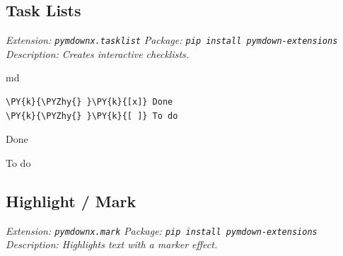 \documentclass[a4paper,twoside]{article}
\begin{document}
\subsection{Task Lists}\label{task-lists}

\emph{Extension: \texttt{pymdownx.tasklist}}
\emph{Package: \texttt{pip install pymdown-\allowbreak{}extensions}}
\emph{Description: Creates interactive checklists.}

\begin{code}{md}{}{}
\begin{Verbatim}[commandchars=\\\{\},breaklines, breakanywhere, commandchars=\\\{\}]
\PY{k}{\PYZhy{} }\PY{k}{[x]} Done
\PY{k}{\PYZhy{} }\PY{k}{[ ]} To do
\end{Verbatim}
\end{code}
\begin{displayquote}

\begin{todolist}
\item[\done] Done
\item To do

\end{todolist}

\end{displayquote}
\subsection{Highlight / Mark}\label{highlight-mark}

\emph{Extension: \texttt{pymdownx.mark}}
\emph{Package: \texttt{pip install pymdown-\allowbreak{}extensions}}
\emph{Description: Highlights text with a marker effect.}
\end{document}
